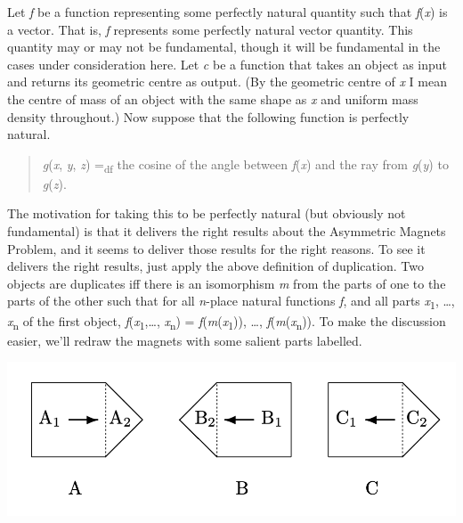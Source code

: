 \documentclass[
  10pt,
  letterpaper,
  DIV=11,
  numbers=noendperiod,
  twoside]{scrartcl}
\begin{document}
Let \emph{f} be a function representing some perfectly natural quantity
such that \emph{f}(\emph{x}) is a vector. That is, \emph{f} represents
some perfectly natural vector quantity. This quantity may or may not be
fundamental, though it will be fundamental in the cases under
consideration here. Let \emph{c} be a function that takes an object as
input and returns its geometric centre as output. (By the geometric
centre of \emph{x} I mean the centre of mass of an object with the same
shape as \emph{x} and uniform mass density throughout.) Now suppose that
the following function is perfectly natural.

\begin{quote}
\emph{g}(\emph{x}, \emph{y}, \emph{z}) =\textsubscript{df} the cosine of
the angle between \emph{f}(\emph{x}) and the ray from \emph{g}(\emph{y})
to \emph{g}(\emph{z}).
\end{quote}

The motivation for taking this to be perfectly natural (but obviously
not fundamental) is that it delivers the right results about the
Asymmetric Magnets Problem, and it seems to deliver those results for
the right reasons. To see it delivers the right results, just apply the
above definition of duplication. Two objects are duplicates iff there is
an isomorphism \emph{m} from the parts of one to the parts of the other
such that for all \emph{n}-place natural functions \emph{f}, and all
parts \emph{x}\textsubscript{1}, \ldots, \emph{x}\textsubscript{n} of
the first object, \textbar{}\emph{f}(\emph{x}\textsubscript{1},\ldots,
\emph{x}\textsubscript{n})\textbar{} =
\textbar{}\emph{f}(\emph{m}(\emph{x}\textsubscript{1})), \ldots,
\emph{f}(\emph{m}(\emph{x}\textsubscript{n}))\textbar. To make the
discussion easier, we'll redraw the magnets with some salient parts
labelled.

\includegraphics{images/amp_4.png}
\end{document}
